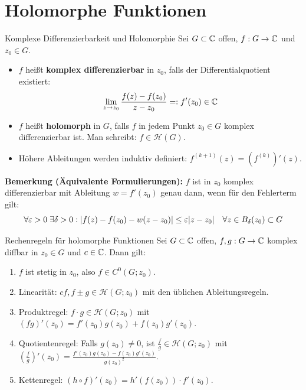 \section{Holomorphe Funktionen}

\begin{defi}{Komplexe Differenzierbarkeit und Holomorphie}
Sei $G \subset \mathbb{C}$ offen, $f: G \to \mathbb{C}$ und $z_0 \in G$.
\begin{itemize}
    \item[i)] $f$ heißt \textbf{komplex differenzierbar} in $z_0$, falls der Differentialquotient existiert:
    \[
        \lim_{z \to z_0} \frac{f(z)-f(z_0)}{z-z_0} =: f'(z_0) \in \mathbb{C}
    \]
    \item[ii)] $f$ heißt \textbf{holomorph} in $G$, falls $f$ in jedem Punkt $z_0 \in G$ komplex differenzierbar ist. Man schreibt: $f \in \mathcal{H}(G)$.
    \item[iii)] Höhere Ableitungen werden induktiv definiert: $f^{(k+1)}(z) = (f^{(k)})'(z)$.
\end{itemize}
\end{defi}

\textbf{Bemerkung (Äquivalente Formulierungen):} 
$f$ ist in $z_0$ komplex differenzierbar mit Ableitung $w = f'(z_0)$ genau dann, wenn für den Fehlerterm gilt:
\[
    \forall \varepsilon > 0 \; \exists \delta > 0 : |f(z)-f(z_0) - w(z-z_0)| \le \varepsilon |z-z_0| \quad \forall z \in B_\delta(z_0) \subset G
\]

\begin{satz}{Rechenregeln für holomorphe Funktionen}
Sei $G \subset \mathbb{C}$ offen, $f, g: G \to \mathbb{C}$ komplex diffbar in $z_0 \in G$ und $c \in \mathbb{C}$. Dann gilt:
\begin{enumerate}
    \item $f$ ist stetig in $z_0$, also $f \in C^0(G; z_0)$.
    \item Linearität: $cf, f \pm g \in \mathcal{H}(G; z_0)$ mit den üblichen Ableitungsregeln.
    \item Produktregel: $f \cdot g \in \mathcal{H}(G; z_0)$ mit $(fg)'(z_0) = f'(z_0)g(z_0) + f(z_0)g'(z_0)$.
    \item Quotientenregel: Falls $g(z_0) \neq 0$, ist $\frac{f}{g} \in \mathcal{H}(G; z_0)$ mit $\left(\frac{f}{g}\right)'(z_0) = \frac{f'(z_0)g(z_0) - f(z_0)g'(z_0)}{g(z_0)^2}$.
    \item Kettenregel: $(h \circ f)'(z_0) = h'(f(z_0)) \cdot f'(z_0)$.
\end{enumerate}
\end{satz}

